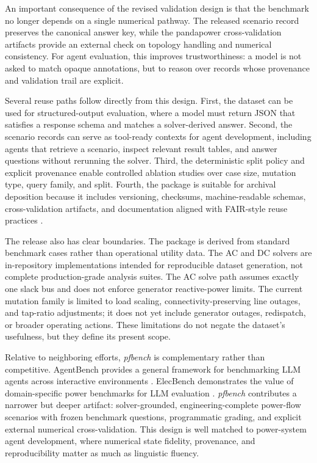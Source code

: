 An important consequence of the revised validation design is that the benchmark no longer depends on a single numerical pathway. The released scenario record preserves the canonical answer key, while the pandapower cross-validation artifacts provide an external check on topology handling and numerical consistency. For agent evaluation, this improves trustworthiness: a model is not asked to match opaque annotations, but to reason over records whose provenance and validation trail are explicit.

Several reuse paths follow directly from this design. First, the dataset can be used for structured-output evaluation, where a model must return JSON that satisfies a response schema and matches a solver-derived answer. Second, the scenario records can serve as tool-ready contexts for agent development, including agents that retrieve a scenario, inspect relevant result tables, and answer questions without rerunning the solver. Third, the deterministic split policy and explicit provenance enable controlled ablation studies over case size, mutation type, query family, and split. Fourth, the package is suitable for archival deposition because it includes versioning, checksums, machine-readable schemas, cross-validation artifacts, and documentation aligned with FAIR-style reuse practices \cite{wilkinson2016fair}.

The release also has clear boundaries. The package is derived from standard benchmark cases rather than operational utility data. The AC and DC solvers are in-repository implementations intended for reproducible dataset generation, not complete production-grade analysis suites. The AC solve path assumes exactly one slack bus and does not enforce generator reactive-power limits. The current mutation family is limited to load scaling, connectivity-preserving line outages, and tap-ratio adjustments; it does not yet include generator outages, redispatch, or broader operating actions. These limitations do not negate the dataset's usefulness, but they define its present scope.

Relative to neighboring efforts, \textit{pfbench} is complementary rather than competitive. AgentBench provides a general framework for benchmarking LLM agents across interactive environments \cite{liu2023agentbench}. ElecBench demonstrates the value of domain-specific power benchmarks for LLM evaluation \cite{zhou2024elecbench}. \textit{pfbench} contributes a narrower but deeper artifact: solver-grounded, engineering-complete power-flow scenarios with frozen benchmark questions, programmatic grading, and explicit external numerical cross-validation. This design is well matched to power-system agent development, where numerical state fidelity, provenance, and reproducibility matter as much as linguistic fluency.

